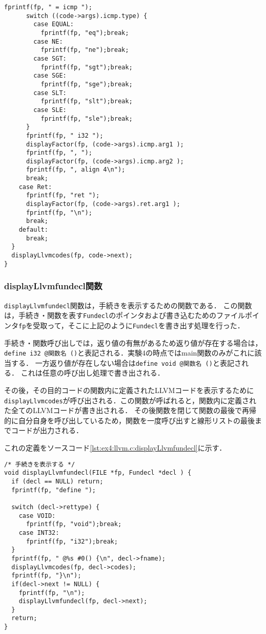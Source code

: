 \documentclass[uplatex]{jsarticle}
\begin{document}
\begin{lstlisting}[caption=displayLlvmcodes関数の定義,label=lst:ex4:llvm.c:displayLlvmcodes]
      fprintf(fp, " = icmp ");
      switch ((code->args).icmp.type) {
        case EQUAL:
          fprintf(fp, "eq");break;
        case NE:
          fprintf(fp, "ne");break;
        case SGT:
          fprintf(fp, "sgt");break;
        case SGE:
          fprintf(fp, "sge");break;
        case SLT:
          fprintf(fp, "slt");break;
        case SLE:
          fprintf(fp, "sle");break;
      }
      fprintf(fp, " i32 ");
      displayFactor(fp, (code->args).icmp.arg1 );
      fprintf(fp, ", ");
      displayFactor(fp, (code->args).icmp.arg2 );
      fprintf(fp, ", align 4\n");
      break;
    case Ret:
      fprintf(fp, "ret ");
      displayFactor(fp, (code->args).ret.arg1 );
      fprintf(fp, "\n");
      break;
    default:
      break;
  }
  displayLlvmcodes(fp, code->next);
}
\end{lstlisting}

\subsubsection{displayLlvmfundecl関数}
\verb#displayLlvmfundecl#関数は，手続きを表示するための関数である．
この関数は，手続き・関数を表す\verb#Fundecl#のポインタおよび書き込むためのファイルポインタ\verb#fp#を受取って，そこに上記のように\verb#Fundecl#を書き出す処理を行った．

手続き・関数呼び出しでは，返り値の有無があるため返り値が存在する場合は，
\verb#define i32 @関数名 ()#と表記される．実験4の時点ではmain関数のみがこれに該当する．
一方返り値が存在しない場合は\verb#define void @関数名 ()#と表記される．
これは任意の呼び出し処理で書き出される．

その後，その目的コードの関数内に定義されたLLVMコードを表示するために\verb#displayLlvmcodes#が呼び出される．この関数が呼ばれると，関数内に定義された全てのLLVMコードが書き出される．
その後関数を閉じて関数の最後で再帰的に自分自身を呼び出しているため，関数を一度呼び出すと線形リストの最後までコードが出力される．

これの定義をソースコード\ref{lst:ex4:llvm.c:displayLlvmfundecl}に示す．

\begin{lstlisting}[caption=displayLlvmfundecl関数の定義,label=lst:ex4:llvm.c:displayLlvmfundecl]
/* 手続きを表示する */
void displayLlvmfundecl(FILE *fp, Fundecl *decl ) {
  if (decl == NULL) return;
  fprintf(fp, "define ");

  switch (decl->rettype) {
    case VOID:
      fprintf(fp, "void");break;
    case INT32:
      fprintf(fp, "i32");break;
  }
  fprintf(fp, " @%s #0() {\n", decl->fname);
  displayLlvmcodes(fp, decl->codes);
  fprintf(fp, "}\n");
  if(decl->next != NULL) {
    fprintf(fp, "\n");
    displayLlvmfundecl(fp, decl->next);
  }
  return;
}
\end{lstlisting}
\end{document}
